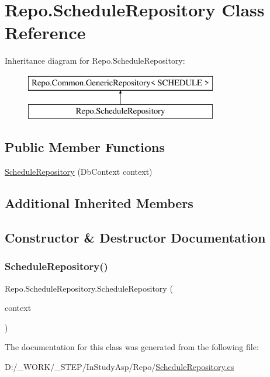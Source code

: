\hypertarget{class_repo_1_1_schedule_repository}{}\section{Repo.\+Schedule\+Repository Class Reference}
\label{class_repo_1_1_schedule_repository}
Inheritance diagram for Repo.\+Schedule\+Repository\+:\begin{figure}[H]
\begin{center}
\leavevmode
\includegraphics[height=2.000000cm]{class_repo_1_1_schedule_repository}
\end{center}
\end{figure}
\subsection*{Public Member Functions}
\begin{DoxyCompactItemize}
\item 
\hyperlink{class_repo_1_1_schedule_repository_ab99694ab2c74fa3af8d40b1e2783f187}{Schedule\+Repository} (Db\+Context context)
\end{DoxyCompactItemize}
\subsection*{Additional Inherited Members}


\subsection{Constructor \& Destructor Documentation}
\mbox{\label{class_repo_1_1_schedule_repository_ab99694ab2c74fa3af8d40b1e2783f187}} 
\subsubsection{\texorpdfstring{Schedule\+Repository()}{ScheduleRepository()}}
{\footnotesize\ttfamily Repo.\+Schedule\+Repository.\+Schedule\+Repository (\begin{DoxyParamCaption}\item[{Db\+Context}]{context }\end{DoxyParamCaption})}



The documentation for this class was generated from the following file\+:\begin{DoxyCompactItemize}
\item 
D\+:/\+\_\+\+W\+O\+R\+K/\+\_\+\+S\+T\+E\+P/\+In\+Study\+Asp/\+Repo/\hyperlink{_schedule_repository_8cs}{Schedule\+Repository.\+cs}\end{DoxyCompactItemize}
